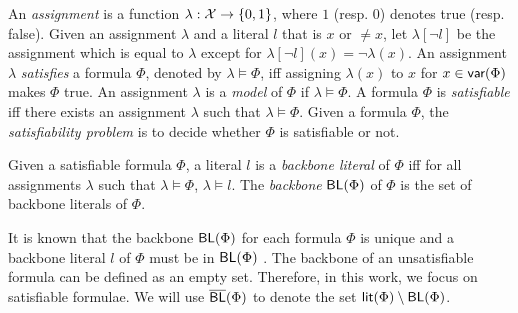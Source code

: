 An \emph{assignment} is a function $\lambda: \mathcal{X} \rightarrow \{0,1\}$, where $1$ (resp. $0$) denotes true (resp. false).
Given an assignment $\lambda$ and a literal $l$ that is $x$ or $\neq x$, let $\lambda[\neg l]$ be the assignment which is equal to $\lambda$
except for $\lambda[\neg l](x)=\neg \lambda(x)$.
An assignment $\lambda$ \emph{satisfies} a formula $\Phi$, denoted by $\lambda\models \Phi$, iff assigning $\lambda(x)$ to $x$ for $x\in\textsf{var}(\Phi)$ makes $\Phi$ true.
An assignment $\lambda$ is a \emph{model} of $\Phi$ if $\lambda\models \Phi$.
A formula $\Phi$ is \emph{satisfiable} iff there exists an assignment $\lambda$ such that $\lambda\models \Phi$.
Given a formula $\Phi$, the \emph{satisfiability problem} is to decide whether $\Phi$ is satisfiable or not.

\smallskip

\begin{definition}[Backbone]
\label{def:backbone}
Given a satisfiable formula $\Phi$, a literal $l$ is a \emph{backbone literal} of $\Phi$ iff for all assignments $\lambda$ such that $\lambda\models\Phi$,
$\lambda\models l$. The \emph{backbone} $\textsf{BL}(\Phi)$ of $\Phi$ is the set of backbone literals of $\Phi$.
\end{definition}



It is known that the backbone $\textsf{BL}(\Phi)$ for each formula $\Phi$ is unique and a backbone literal $l$ of $\Phi$ must be in
$\textsf{BL}(\Phi)$ \cite{JLM15}.
The backbone of an unsatisfiable formula can be defined as an empty set. Therefore, in this work, we focus on satisfiable formulae.
We will use $\overline{\textsf{BL}}(\Phi)$ to denote the set
$\textsf{lit}(\Phi)\setminus \textsf{BL}(\Phi)$.

